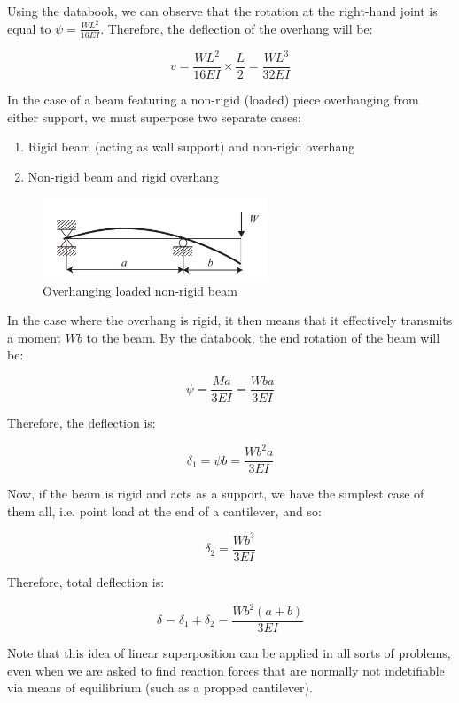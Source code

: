 \documentclass{article}
\begin{document}
Using the databook, we can observe that the rotation at the right-hand joint is equal to $\psi = \frac{WL^2}{16EI}$. Therefore, the deflection of the overhang will be:

\[ v = \frac{WL^2}{16EI} \times \frac{L}{2} = \frac{WL^3}{32EI} \]

\begin{proposition}
    In the case of a beam featuring a non-rigid (loaded) piece overhanging from either support, we must superpose two separate cases:
    \begin{enumerate}
        \item Rigid beam (acting as wall support) and non-rigid overhang
        \item Non-rigid beam and rigid overhang
    \end{enumerate}
\end{proposition}

\begin{figure}[h]
    \centering
    \includegraphics[width = 0.6\textwidth]{images/overhang2.png}
    \caption{Overhanging loaded non-rigid beam}
    \label{fig:enter-label}
\end{figure}

In the case where the overhang is rigid, it then means that it effectively transmits a moment $Wb$ to the beam. By the databook, the end rotation of the beam will be:

\[ \psi = \frac{Ma}{3EI} = \frac{Wba}{3EI} \]

Therefore, the deflection is:

\[ \delta_1 = \psi b = \frac{Wb^2a}{3EI} \]

Now, if the beam is rigid and acts as a support, we have the simplest case of them all, i.e. point load at the end of a cantilever, and so:

\[ \delta_2 = \frac{Wb^3}{3EI} \]

Therefore, total deflection is:

\[ \delta = \delta_1 + \delta_2 = \frac{Wb^2(a + b)}{3EI} \]

Note that this idea of linear superposition can be applied in all sorts of problems, even when we are asked to find reaction forces that are normally not indetifiable via means of equilibrium (such as a propped cantilever).
\end{document}
